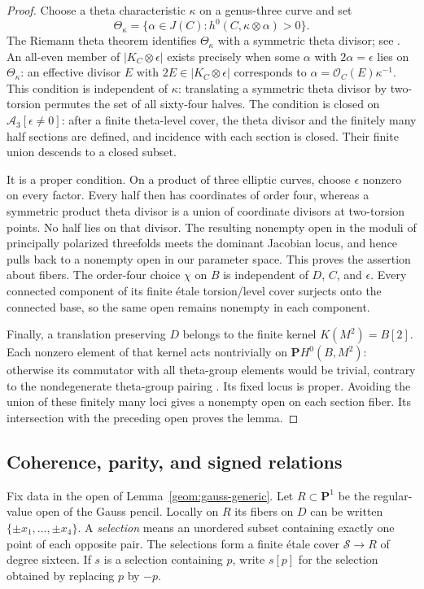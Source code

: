 \documentclass[11pt]{amsart}
\newcommand{\PP}{\mathbf P}
\theoremstyle{definition}
\theoremstyle{remark}
\numberwithin{equation}{section}
\begin{document}
\begin{proof}
Choose a theta characteristic $\kappa$ on a genus-three curve and set
\[
 \Theta_\kappa=
 \{\alpha\in J(C):h^0(C,\kappa\otimes\alpha)>0\}.
\]
The Riemann theta theorem identifies $\Theta_\kappa$ with a symmetric
theta divisor; see \cite[Chapter~II, Section~3, Corollary~3.6 and
Theorem~3.10]{MumfordTheta}.  An all-even member of
$|K_C\otimes\epsilon|$ exists precisely when
some $\alpha$ with $2\alpha=\epsilon$ lies on $\Theta_\kappa$:
an effective divisor $E$ with $2E\in|K_C\otimes\epsilon|$ corresponds
to $\alpha=\mathcal O_C(E)\kappa^{-1}$.  This condition is independent
of $\kappa$: translating a symmetric theta divisor by two-torsion
permutes the set of all sixty-four halves.  The condition is closed
on $\mathcal A_3[\epsilon\ne0]$: after a finite theta-level cover,
the theta divisor and the finitely many half sections are defined,
and incidence with each section is closed.  Their finite union
descends to a closed subset.

It is a proper condition.  On a product of three elliptic curves,
choose $\epsilon$ nonzero on every factor.  Every half then has
coordinates of order four, whereas a symmetric product theta divisor
is a union of coordinate divisors at two-torsion points.  No half lies
on that divisor.  The resulting nonempty open in the moduli of
principally polarized threefolds meets the dominant Jacobian locus,
and hence pulls back to a nonempty open in our parameter space.  This
proves the assertion about fibers.  The order-four choice $\chi$ on
$B$ is independent of $D$, $C$, and $\epsilon$.  Every connected
component of its finite étale torsion/level cover surjects onto the
connected base, so the same open remains nonempty in each component.

Finally, a translation preserving $D$ belongs to the finite kernel
$K(M^2)=B[2]$.  Each nonzero element of that kernel acts
nontrivially on $\PP H^0(B,M^2)$: otherwise its commutator with all
theta-group elements would be trivial, contrary to the nondegenerate
theta-group pairing \cite{BirkenhakeLange}.  Its fixed locus is proper.
Avoiding the union of these finitely many loci gives a nonempty
open on each section fiber.  Its intersection with the preceding
open proves the lemma.
\end{proof}

\subsection{Coherence, parity, and signed relations}

Fix data in the open of Lemma~\ref{geom:gauss-generic}.
Let $R\subset\PP^1$ be the regular-value open of the Gauss pencil.
Locally on $R$ its fibers on $D$ can be written
$\{\pm x_1,\ldots,\pm x_4\}$.  A \emph{selection} means an unordered
subset containing exactly one point of each opposite pair.  The
selections form a finite étale cover $\mathcal S\to R$ of degree
sixteen.  If $s$ is a selection containing $p$, write $s[p]$ for the
selection obtained by replacing $p$ by $-p$.
\end{document}
